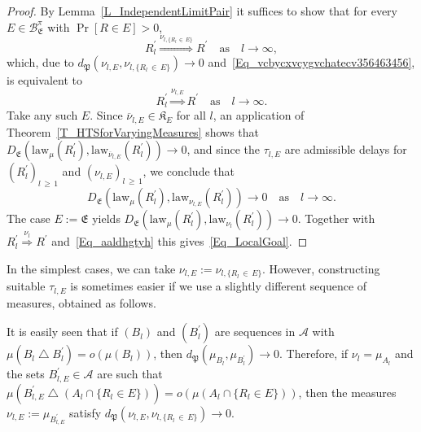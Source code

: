 \documentclass[AHL,Unicode,longabstracts]{cedram}
\newcommand{\clA}{\mathcal{A}}
\newcommand{\clB}{\mathcal{B}}
\newcommand{\law}{\mathrm{law}}
\newcommand{\frkK}{\mathfrak{K}}
\newcommand{\frkP}{\mathfrak{P}}
\newcommand{\frkE}{\mathfrak{E}}
\begin{document}
\begin{proof}
By Lemma~\ref{L_IndependentLimitPair} it suffices to show that for every $E\in\clB_{\frkE}^{\pi}$ with $\Pr[R\in E]>0$,
\[
R_{l}^{\prime}\overset{\nu_{l,\{R_{l}\,\in\,E\}}}{\Longrightarrow}R^{\prime }\quad\text{as}\quad l\rightarrow\infty,
\]
which, due to $d_{\frkP}(\nu_{l,E},\nu_{l,\{R_{l}\,\in\,E\}})\rightarrow0$ and~\eqref{Eq_vcbycxvcygvchatecv356463456}, is equivalent to
\begin{equation}\label{Eq_LocalGoal}
R_{l}^{\prime}\overset{\nu_{l,E}}{\Longrightarrow}R^{\prime}
\quad\text{as}\quad l\rightarrow\infty.
\end{equation}
Take any such $E$. Since $\overline{\nu}_{l,E}\in\frkK_{E}$ for all $l$, an application of Theorem~\ref{T_HTSforVaryingMeasures} shows that $D_{\frkE}(\law_{\mu}(R_{l}^{\prime}),\law _{\overline{\nu}_{l,E}}(R_{l}^{\prime}))\rightarrow0$, and since the $\tau_{l,E}$ are admissible delays for $(R_{l}^{\prime})_{l\,\geq\,1}$ and $(\nu_{l,E})_{l\,\geq\,1}$, we conclude that
\begin{equation}\label{Eq_aaldhgtyh}
D_{\frkE}\left(\law_{\mu}\left(R_{l}^{\prime}\right),\law_{\nu_{l,E} }\left(R_{l}^{\prime}\right)\right)\longrightarrow0\quad\text{as}\quad l\rightarrow
\infty.
\end{equation}
The case $E:=\frkE$ yields $D_{\frkE}(\law_{\mu} (R_{l}^{\prime}),\law_{\nu_{l}}(R_{l}^{\prime}))\rightarrow0$. Together with $R_{l}^{\prime}\overset{\nu_{l}}{\Longrightarrow}R^{\prime}$ and~\eqref{Eq_aaldhgtyh} this gives~\eqref{Eq_LocalGoal}.
\end{proof}



\begin{rema}
In the simplest cases, we can take $\nu_{l,E}:=\nu_{l,\{R_{l}\,\in\,E\}}$. However, constructing suitable $\tau_{l,E}$ is sometimes easier if we use a slightly different sequence of measures, obtained as follows.

It is easily seen that if $(B_{l})$ and $(B_{l}^{\prime})$ are sequences in $\clA$ with $\mu(B_{l}\bigtriangleup B_{l}^{\prime})=o(\mu(B_{l}))$, then $d_{\frkP}(\mu_{B_{l}},\mu_{B_{l}^{\prime}})\rightarrow0$. Therefore, if $\nu_{l}=\mu_{A_{l}}$ and the sets $B_{l,E}^{\prime}
\in\clA$ are such that $\mu(B_{l,E}^{\prime}\bigtriangleup(A_{l}\cap\{R_{l}\in E\}))=o(\mu(A_{l}\cap\{R_{l}\in E\}))$, then the measures $\nu_{l,E}:=\mu_{B_{l,E}^{\prime}}$ satisfy $d_{\frkP}(\nu_{l,E},\nu_{l,\{R_{l}\,\in \,E\}})\rightarrow0$.
\end{rema}
\end{document}
